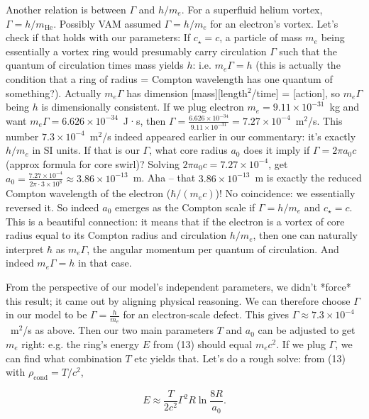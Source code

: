 \documentclass[12pt]{article}
\begin{document}
Another relation is between $\Gamma$ and $h/m_e$. For a superfluid helium vortex, $\Gamma = h/m_{\text{He}}$. Possibly VAM assumed $\Gamma = h/m_e$ for an electron’s vortex. Let’s check if that holds with our parameters: If $c_\star = c$, a particle of mass $m_e$ being essentially a vortex ring would presumably carry circulation $\Gamma$ such that the quantum of circulation times mass yields $h$: i.e. $m_e \Gamma = h$ (this is actually the condition that a ring of radius = Compton wavelength has one quantum of something?). Actually $m_e \Gamma$ has dimension [mass][length$^2$/time] = [action], so $m_e \Gamma$ being $h$ is dimensionally consistent. If we plug electron $m_e = 9.11\times10^{-31}$ kg and want $m_e \Gamma = 6.626\times10^{-34}$ J·s, then $\Gamma = \frac{6.626\times10^{-34}}{9.11\times10^{-31}} = 7.27\times10^{-4}$ m$^2$/s. This number $7.3\times10^{-4}$ m$^2$/s indeed appeared earlier in our commentary: it’s exactly $h/m_e$ in SI units. If that is our $\Gamma$, what core radius $a_0$ does it imply if $\Gamma = 2\pi a_0 c$ (approx formula for core swirl)? Solving $2\pi a_0 c = 7.27\times10^{-4}$, get $a_0 = \frac{7.27\times10^{-4}}{2\pi \cdot 3\times10^8} \approx 3.86\times10^{-13}$ m. Aha – that $3.86\times10^{-13}$ m is exactly the reduced Compton wavelength of the electron ($\hbar/(m_e c)$)! No coincidence: we essentially reversed it. So indeed $a_0$ emerges as the Compton scale if $\Gamma = h/m_e$ and $c_\star=c$. This is a beautiful connection: it means that if the electron is a vortex of core radius equal to its Compton radius and circulation $h/m_e$, then one can naturally interpret $\hbar$ as $m_e \Gamma$, the angular momentum per quantum of circulation. And indeed $m_e \Gamma = h$ in that case. 

From the perspective of our model’s independent parameters, we didn’t *force* this result; it came out by aligning physical reasoning. We can therefore choose $\Gamma$ in our model to be $\Gamma = \frac{h}{m_e}$ for an electron-scale defect. This gives $\Gamma \approx 7.3\times10^{-4}$ m$^2$/s as above. Then our two main parameters $T$ and $a_0$ can be adjusted to get $m_e$ right: e.g. the ring’s energy $E$ from (13) should equal $m_e c^2$. If we plug $\Gamma$, we can find what combination $T$ etc yields that. Let’s do a rough solve: from (13) with $\rho_{\text{cond}} = T/c^2$, 

\[E \approx \frac{T}{2c^2} \Gamma^2 R \ln\frac{8R}{a_0}. \]
\end{document}
